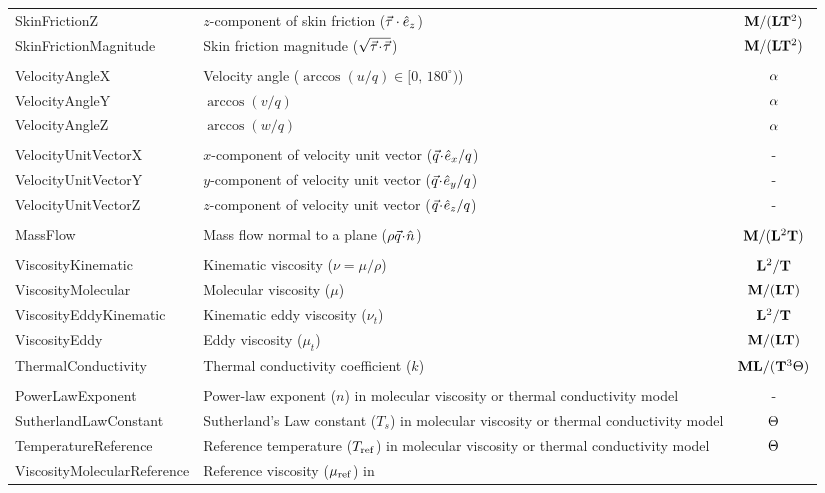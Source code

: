 \begin{longtable}{>{\ttfamily}l >{\raggedright\arraybackslash}p{\Pwidth} c}
SkinFrictionZ           & $z$-component of skin friction (${\vec{\tau}} \cdot \hat{e}_z$) &
   ${\bf M}/({\bf L} {\bf T}^2)$ \\
SkinFrictionMagnitude   & Skin friction magnitude ($\sqrt{ {\vec{\tau}}\!\cdot\!{\vec{\tau}} }$) &
   ${\bf M}/({\bf L} {\bf T}^2)$ \\
\\
VelocityAngleX          & Velocity angle ($\arccos(u/q) \in [0,\,180^\circ)$) &
   ${\alpha}$ \\
VelocityAngleY          & $\arccos(v/q)$ &
   ${\alpha}$ \\
VelocityAngleZ          & $\arccos(w/q)$ &
   ${\alpha}$ \\
\\
VelocityUnitVectorX     & $x$-component of velocity unit vector (${\vec{q}}\!\cdot\!\hat{e}_x / q$) &
   - \\
VelocityUnitVectorY     & $y$-component of velocity unit vector (${\vec{q}}\!\cdot\!\hat{e}_y / q$) &
   - \\
VelocityUnitVectorZ     & $z$-component of velocity unit vector (${\vec{q}}\!\cdot\!\hat{e}_z / q$) &
   - \\
\\
MassFlow                & Mass flow normal to a plane ($\rho {\vec{q}}\!\cdot\!{\hat{n}}$) &
   ${\bf M}/({\bf L}^2 {\bf T})$ \\
\\
ViscosityKinematic      & Kinematic viscosity ($\nu = \mu / \rho$) &
   ${\bf L}^2/{\bf T}$ \\
ViscosityMolecular      & Molecular viscosity ($\mu$) &
   ${\bf M}/({\bf L} {\bf T})$ \\
ViscosityEddyKinematic  & Kinematic eddy viscosity ($\nu_t$) &
   ${\bf L}^2/{\bf T}$ \\
ViscosityEddy           & Eddy viscosity ($\mu_t$) &
   ${\bf M}/({\bf L} {\bf T})$ \\
ThermalConductivity     & Thermal conductivity coefficient ($k$) &
   ${\bf M} {\bf L}/({\bf T}^3 {\Theta})$ \\
\\
PowerLawExponent        & Power-law exponent ($n$) in molecular viscosity
                          or thermal conductivity model &
   - \\
SutherlandLawConstant   & Sutherland's Law constant ($T_s$) in molecular
                          viscosity or thermal conductivity model &
   ${\Theta}$ \\
TemperatureReference    & Reference temperature ($T_{\rm ref}$) in molecular
                          viscosity or thermal conductivity model &
   ${\Theta}$ \\
ViscosityMolecularReference  & Reference viscosity ($\mu_{\rm ref}$) in

\end{longtable}
